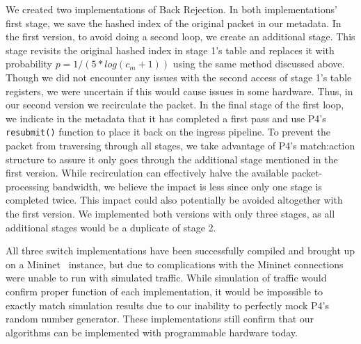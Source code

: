 We created two implementations of Back Rejection. In both implementations' first stage, we save the hashed index of the original packet in our metadata. In the first version, to avoid doing a second loop, we create an additional stage. This stage revisits the original hashed index in stage 1's table and replaces it with probability $p = 1 / (5*log(c_m + 1))$ using the same method discussed above. Though we did not encounter any issues with the second access of stage 1's table registers, we were uncertain if this would cause issues in some hardware. Thus, in our second version we recirculate the packet. In the final stage of the first loop, we indicate in the metadata that it has completed a first pass and use P4's \verb+resubmit()+ function to place it back on the ingress pipeline. To prevent the packet from traversing through all stages, we take advantage of P4's match:action structure to assure it only goes through the additional stage mentioned in the first version. While recirculation can effectively halve the available packet-processing bandwidth, we believe the impact is less since only one stage is completed twice. This impact could also potentially be avoided altogether with the first version. We implemented both versions with only three stages, as all additional stages would be a duplicate of stage 2.

All three switch implementations have been successfully compiled and brought up on a Mininet~\cite{mininet} instance, but due to complications with the Mininet connections were unable to run with simulated traffic. While simulation of traffic would confirm proper function of each implementation, it would be impossible to exactly match simulation results due to our inability to perfectly mock P4's random number generator. These implementations still confirm that our algorithms can be implemented with programmable hardware today.

